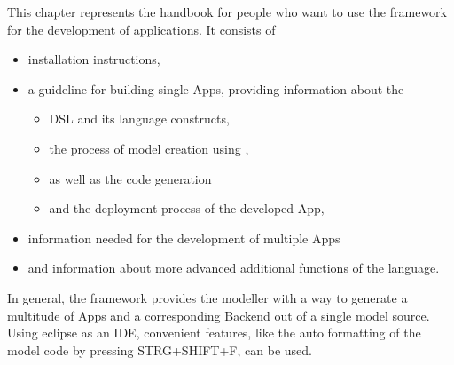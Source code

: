 

This chapter represents the handbook for people who want to use the \MD framework for the development of applications. It consists of

\begin{itemize}
	\item installation instructions,
	\item a guideline for building single Apps, providing information about the
	\begin{itemize}
		\item DSL and its language constructs,
		\item the process of model creation using \MD,
		\item as well as the code generation
		\item and the deployment process of the developed App,
	\end{itemize}
	\item information needed for the development of multiple Apps
	\item and information about more advanced additional functions of the language.
\end{itemize}

In general, the \MD framework provides the modeller with a way to generate a multitude of Apps and a corresponding Backend out of a single model source. Using eclipse as an IDE, convenient features, like the auto formatting of the model code by pressing STRG+SHIFT+F, can be used.